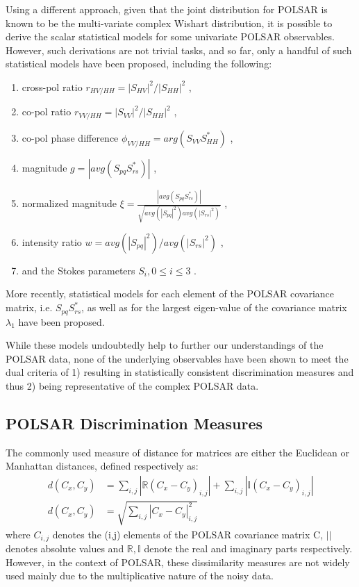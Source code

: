 \documentclass[journal]{IEEEtran}
\begin{document}
Using a different approach, given that the joint distribution for POLSAR is known to be the multi-variate complex Wishart distribution,
  it is possible to derive the scalar statistical models for some univariate POLSAR observables.
However, such derivations are not trivial tasks, and so far, only a handful of such statistical models have been proposed, including the following:
  \begin{enumerate}
  \item cross-pol ratio $r_{HV/HH} = |S_{HV}|^2/|S_{HH}|^2$ \cite{Joughin_1994_TGRS_562},
  \item co-pol ratio $r_{VV/HH} = |S_{VV}|^2/|S_{HH}|^2$ \cite{Joughin_1994_TGRS_562},
  \item co-pol phase difference $\phi_{VV/HH} = arg(S_{VV}S_{HH}^*) $ \cite{Joughin_1994_TGRS_562} \cite{Lee_1994_TGRS_1017},
  \item magnitude $g=|avg(S_{pq}S_{rs}^*)|$ \cite{Lee_1994_TGRS_1017},
  \item normalized magnitude $\xi = \frac{|avg(S_{pq}S_{rs}^*)|}{\sqrt{avg(|S_{pq}|^2) avg(|S_{rs}|^2)}}$ \cite{Lee_1994_TGRS_1017},
  \item intensity ratio $w = avg(|S_{pq}|^2)/avg(|S_{rs}|^2)$ \cite{Lee_1994_TGRS_1017},
  \item and the Stokes parameters $S_i,0 \leq i \leq 3$ \cite{Touzi_1996_TGRS_519}. 
  \end{enumerate}
More recently, statistical models for
  each element of the POLSAR covariance matrix, i.e. $S_{pq}S_{rs}^*$, \cite{Lopez-Martinez_2003_TGRS_2232}
  as well as for the largest eigen-value of the covariance matrix $\lambda_1$ \cite{Erten_2012_Sensors_2766} have been proposed.

While these models undoubtedly help to further our understandings of the POLSAR data,
  none of the underlying observables have been shown to meet the dual criteria of
  1) resulting in statistically consistent discrimination measures and thus 
  2) being representative of the complex POLSAR data.

\subsection{POLSAR Discrimination Measures}
\label{sec:lit_measures}

The commonly used measure of distance for matrices are either the Euclidean or Manhattan distances, defined respectively as:
\begin{align}
  d(C_x,C_y) &= \sum_{i,j} |\mathbb{R} (C_x - C_y)_{i,j}| + \sum_{i,j} |\mathbb{I} (C_x - C_y)_{i,j}| \\
  d(C_x,C_y) &= \sqrt{\sum_{i,j} |C_x - C_y|_{i,j}^2 }
\end{align}
where $C_{i,j}$ denotes the (i,j) elements of the POLSAR covariance matrix C,
 $||$ denotes absolute values
and $\mathbb{R},\mathbb{I}$ denote the real and imaginary parts respectively.
However, in the context of POLSAR, %
  these dissimilarity measures are not widely used 
  mainly due to the multiplicative nature of the noisy data.
\end{document}
